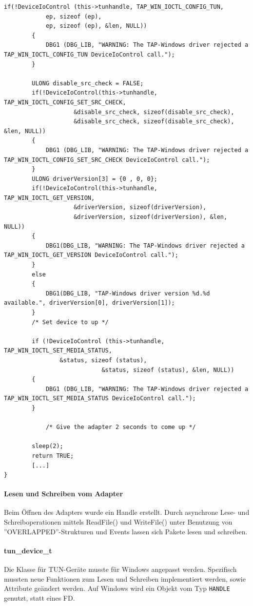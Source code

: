 {\begin{lstlisting}[caption=Konfiguration eines TAP-Geräts,label=lst:tap-device-configuration]
        if(!DeviceIoControl (this->tunhandle, TAP_WIN_IOCTL_CONFIG_TUN,
            ep, sizeof (ep),
            ep, sizeof (ep), &len, NULL))
        {
            DBG1 (DBG_LIB, "WARNING: The TAP-Windows driver rejected a TAP_WIN_IOCTL_CONFIG_TUN DeviceIoControl call.");
        }

        ULONG disable_src_check = FALSE;
        if(!DeviceIoControl(this->tunhandle, TAP_WIN_IOCTL_CONFIG_SET_SRC_CHECK,
                    &disable_src_check, sizeof(disable_src_check),
                    &disable_src_check, sizeof(disable_src_check), &len, NULL))
        {
            DBG1 (DBG_LIB, "WARNING: The TAP-Windows driver rejected a TAP_WIN_IOCTL_CONFIG_SET_SRC_CHECK DeviceIoControl call.");
        }
        ULONG driverVersion[3] = {0 , 0, 0};
        if(!DeviceIoControl(this->tunhandle, TAP_WIN_IOCTL_GET_VERSION,
                    &driverVersion, sizeof(driverVersion),
                    &driverVersion, sizeof(driverVersion), &len, NULL))
        {
            DBG1(DBG_LIB, "WARNING: The TAP-Windows driver rejected a TAP_WIN_IOCTL_GET_VERSION DeviceIoControl call.");
        }
        else
        {
            DBG1(DBG_LIB, "TAP-Windows driver version %d.%d available.", driverVersion[0], driverVersion[1]);
        }
        /* Set device to up */

        if (!DeviceIoControl (this->tunhandle, TAP_WIN_IOCTL_SET_MEDIA_STATUS,
                &status, sizeof (status),
                            &status, sizeof (status), &len, NULL))
        {
            DBG1 (DBG_LIB, "WARNING: The TAP-Windows driver rejected a TAP_WIN_IOCTL_SET_MEDIA_STATUS DeviceIoControl call.");
        }

            /* Give the adapter 2 seconds to come up */

        sleep(2);
        return TRUE;
        [...]
}
\end{lstlisting}


\paragraph{Lesen und Schreiben vom Adapter}
Beim Öffnen des Adapters wurde ein Handle erstellt.
Durch asynchrone Lese- und Schreiboperationen mittels ReadFile() und WriteFile()
unter Benutzung von ''OVERLAPPED''-Strukturen und Events lassen sich Pakete
lesen und schreiben.

\paragraph{tun\_device\_t}
Die Klasse für TUN-Geräte musste für Windows angepasst werden.
Spezifisch mussten neue Funktionen zum Lesen und Schreiben implementiert werden,
sowie Attribute geändert werden.
Auf Windows wird ein Objekt vom Typ \texttt{HANDLE} genutzt, statt eines \ac{FD}.

}
